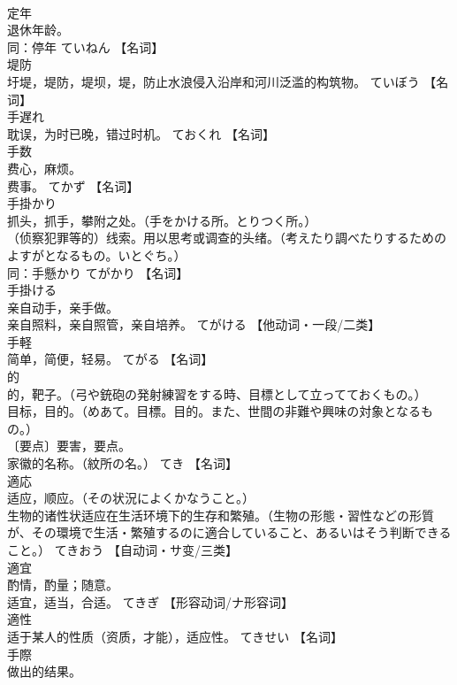 \documentclass[8pt]{extreport}
\begin{document}
\begin{CJK}{UTF8}{min}
\\	定年	
\\	退休年龄。 
\\	同：停年	ていねん		【名词】
\\	堤防	
\\	圩堤，堤防，堤坝，堤，防止水浪侵入沿岸和河川泛滥的构筑物。	ていぼう		【名词】
\\	手遅れ	
\\	耽误，为时已晚，错过时机。	ておくれ		【名词】
\\	手数	
\\	费心，麻烦。 
\\	费事。	てかず		【名词】
\\	手掛かり	
\\	抓头，抓手，攀附之处。（手をかける所。とりつく所。） 
\\	（侦察犯罪等的）线索。用以思考或调查的头绪。（考えたり調べたりするためのよすがとなるもの。いとぐち。） 
\\	同：手懸かり	てがかり		【名词】
\\	手掛ける	
\\	亲自动手，亲手做。 
\\	亲自照料，亲自照管，亲自培养。	てがける		【他动词・一段/二类】
\\	手軽	
\\	简单，简便，轻易。	てがる		【名词】
\\	的	
\\	的，靶子。（弓や銃砲の発射練習をする時、目標として立ってておくもの。） 
\\	目标，目的。（めあて。目標。目的。また、世間の非難や興味の対象となるもの。） 
\\	〔要点〕要害，要点。 
\\	家徽的名称。（紋所の名。）	てき		【名词】
\\	適応	
\\	适应，顺应。（その状況によくかなうこと。） 
\\	生物的诸性状适应在生活环境下的生存和繁殖。（生物の形態・習性などの形質が、その環境で生活・繁殖するのに適合していること、あるいはそう判断できること。）	てきおう		【自动词・サ变/三类】
\\	適宜	
\\	酌情，酌量；随意。 
\\	适宜，适当，合适。	てきぎ		【形容动词/ナ形容词】
\\	適性	
\\	适于某人的性质（资质，才能），适应性。	てきせい		【名词】
\\	手際	
\\	做出的结果。 

\end{CJK}
\end{document}
